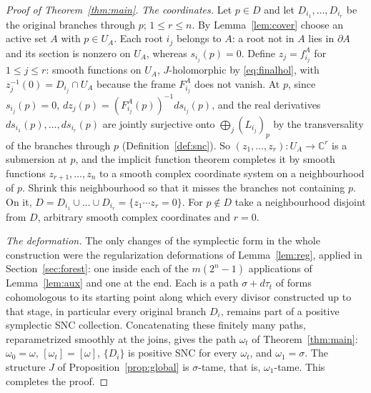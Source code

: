 \documentclass[12pt]{article}
\theoremstyle{remark}
\newcommand{\C}{\mathbb C}
\begin{document}
\begin{proof}[Proof of Theorem~\ref{thm:main}]
\emph{The coordinates.} Let $p\in D$ and let $D_{i_1},\dots,D_{i_r}$
be the original branches through $p$; $1\le r\le n$. By
Lemma~\ref{lem:cover} choose an active set $A$ with $p\in U_A$. Each
root $i_j$ belongs to $A$: a root not in $A$ lies in $\partial A$ and
its section is nonzero on $U_A$, whereas $s_{i_j}(p)=0$. Define
$z_j=f^A_{i_j}$ for $1\le j\le r$: smooth functions on $U_A$,
$J$-holomorphic by \eqref{eq:finalhol}, with $z_j^{-1}(0)=D_{i_j}\cap U_A$
because the frame $F^A_{i_j}$ does not vanish. At $p$, since
$s_{i_j}(p)=0$, $dz_j(p)=(F^A_{i_j}(p))^{-1}ds_{i_j}(p)$, and the real
derivatives $ds_{i_1}(p),\dots,ds_{i_r}(p)$ are jointly surjective onto
$\bigoplus_j(L_{i_j})_p$ by the transversality of the branches through
$p$ (Definition~\ref{def:snc}). So $(z_1,\dots,z_r)\colon U_A\to\C^r$
is a submersion at $p$, and the implicit function theorem completes it
by smooth functions $z_{r+1},\dots,z_n$ to a smooth complex coordinate
system on a neighbourhood of $p$. Shrink this
neighbourhood so that it misses the branches not containing $p$. On it,
$D=D_{i_1}\cup\dots\cup D_{i_r}=\{z_1\cdots z_r=0\}$. For $p\notin D$
take a neighbourhood disjoint from $D$, arbitrary smooth complex
coordinates and $r=0$.

\emph{The deformation.} The only changes of the symplectic form in the
whole construction were the regularization deformations of
Lemma~\ref{lem:reg}, applied in Section~\ref{sec:forest}: one inside
each of the $m(2^n-1)$ applications of Lemma~\ref{lem:aux} and one at
the end. Each is a path $\sigma+d\tau_t$ of forms cohomologous to its
starting point along which every divisor constructed up to that stage,
in particular every original branch $D_i$, remains part of a positive
symplectic SNC collection. Concatenating these finitely many paths,
reparametrized smoothly at the joins, gives the path $\omega_t$ of
Theorem~\ref{thm:main}: $\omega_0=\omega$, $[\omega_t]=[\omega]$,
$\{D_i\}$ is positive SNC for every $\omega_t$, and $\omega_1=\sigma$.
The structure $J$ of Proposition~\ref{prop:global} is $\sigma$-tame,
that is, $\omega_1$-tame. This completes the proof.
\end{proof}
\end{document}
